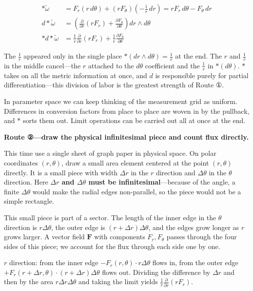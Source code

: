 \[\begin{aligned}
\ast\tilde{\omega} &= F_r(r\,d\theta) + (r F_\theta)\!\left(-\frac{1}{r}\,dr\right) = r F_r\,d\theta - F_\theta\,dr \\[0.3em]
d\ast\tilde{\omega} &= \left(\frac{\partial}{\partial r}(r F_r) + \frac{\partial F_\theta}{\partial \theta}\right) dr \wedge d\theta \\[0.3em]
\ast d\ast\tilde{\omega} &= \frac{1}{r}\frac{\partial}{\partial r}(r F_r) + \frac{1}{r}\frac{\partial F_\theta}{\partial \theta}
\end{aligned}\]

The \(\frac{1}{r}\) appeared only in the single place
\(\ast(dr\wedge d\theta) = \frac{1}{r}\) at the end. The \(r\) and
\(\frac{1}{r}\) in the middle cancel---the \(r\) attached to the
\(d\theta\) coefficient and the \(\frac{1}{r}\) in \(\ast(d\theta)\).
\(\ast\) takes on all the metric information at once, and \(d\) is
responsible purely for partial differentiation---this division of labor
is the greatest strength of Route ①.

In parameter space we can keep thinking of the measurement grid as
uniform. Differences in conversion factors from place to place are woven
in by the pullback, and \(\ast\) sorts them out. Limit operations can be
carried out all at once at the end.

\textbf{Route ②—draw the physical infinitesimal piece and count flux directly.}

This time use a single sheet of graph paper in physical space. On polar
coordinates \((r,\theta)\), draw a small area element centered at the
point \((r,\theta)\) directly. It is a small piece with width
\(\Delta r\) in the \(r\) direction and \(\Delta\theta\) in the
\(\theta\) direction. Here
\textbf{$\Delta r$ and $\Delta\theta$ must be infinitesimal}---because
of the angle, a finite \(\Delta\theta\) would make the radial edges
non-parallel, so the piece would not be a simple rectangle.

This small piece is part of a sector. The length of the inner edge in
the \(\theta\) direction is \(r\Delta\theta\), the outer edge is
\((r+\Delta r)\Delta\theta\), and the edges grow longer as \(r\) grows
larger. A vector field \(\mathbf{F}\) with components \(F_r,F_\theta\)
passes through the four sides of this piece; we account for the flux
through each side one by one.

\(r\) direction: from the inner edge
\(-F_r(r,\theta) \cdot r\Delta\theta\) flows in, from the outer edge
\(+F_r(r+\Delta r,\theta) \cdot (r+\Delta r)\Delta\theta\) flows out.
Dividing the difference by \(\Delta r\) and then by the area
\(r\Delta r\Delta\theta\) and taking the limit yields
\(\frac{1}{r}\frac{\partial}{\partial r}(rF_r)\).

